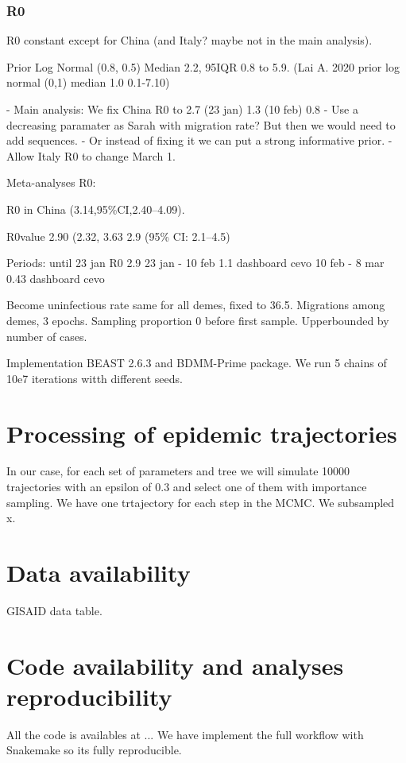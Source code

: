 \subsubsection{R0}
R0 constant except for China (and Italy? maybe not in the main analysis).

Prior Log Normal (0.8, 0.5) Median 2.2, 95IQR 0.8 to 5.9.
(Lai A. 2020 prior log normal (0,1) median 1.0 0.1-7.10)

- Main analysis: We fix China R0 to 2.7 (23 jan) 1.3 (10 feb) 0.8
- Use a decreasing paramater as Sarah with migration rate? But then we would need to add sequences.
- Or instead of fixing it we can put a strong informative prior.
- Allow Italy R0 to change March 1.


Meta-analyses R0:

R0 in China (3.14,95\%CI,2.40–4.09).\cite{Billah2020}

R0value 2.90 (2.32, 3.63
 2.9 (95\% CI: 2.1–4.5)\cite{Park2020}


Periods:
until 23 jan R0 2.9 
23 jan - 10 feb 1.1 dashboard cevo
10 feb - 8 mar 0.43 dashboard cevo



Become uninfectious rate same for all demes, fixed to 36.5.
Migrations among demes, 3 epochs.
Sampling proportion 0 before first sample. Upperbounded by number of cases.

Implementation BEAST 2.6.3 and BDMM-Prime package.
We run 5 chains of 10e7 iterations witth different seeds.

\section{Processing of epidemic trajectories}
In our case, for each set of parameters and tree we will simulate 10000 trajectories with an epsilon of 0.3 and select one of them with importance sampling.
We have one trtajectory for each step in the MCMC. We subsampled x. 

\section{Data availability}
GISAID data table.

\section{Code availability and analyses reproducibility}
All the code is availables at ...
We have implement the full workflow with Snakemake so its fully reproducible.

